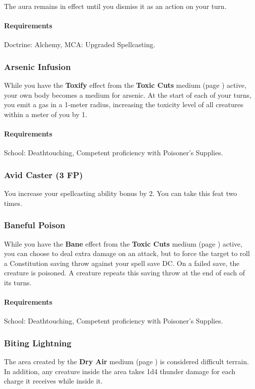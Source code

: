     The aura remains in effect until you dismiss it as an action on your turn.
    \paragraph{Requirements} Doctrine: Alchemy, MCA: Upgraded Spellcasting.
\subsubsection{Arsenic Infusion} \label{feat::arsenicinfusion}
    While you have the \textbf{Toxify} effect from the \textbf{Toxic Cuts} medium (page \pageref{medium::toxiccuts}) active, your own body becomes a medium for arsenic.
    At the start of each of your turns, you emit a gas in a 1-meter radius, increasing the toxicity level of all creatures within a meter of you by 1.
    \paragraph{Requirements} School: Deathtouching, Competent proficiency with Poisoner's Supplies.
\subsubsection{Avid Caster (3 FP)} \label{feat::avidcaster}
    You increase your spellcasting ability bonus by 2.
    You can take this feat two times.
\subsubsection{Baneful Poison} \label{feat::banefulpoison}
    While you have the \textbf{Bane} effect from the \textbf{Toxic Cuts} medium (page \pageref{medium::toxiccuts}) active, you can choose to deal extra damage on an attack, but to force the target to roll a Constitution saving throw against your spell save DC.
    On a failed save, the creature is poisoned.
    A creature repeats this saving throw at the end of each of its turns.
    \paragraph{Requirements} School: Deathtouching, Competent proficiency with Poisoner's Supplies.
\subsubsection{Biting Lightning} \label{feat::bitinglightning}
    The area created by the \textbf{Dry Air} medium (page \pageref{medium::dryair}) is considered difficult terrain.
    In addition, any creature inside the area takes 1d4 thunder damage for each charge it receives while inside it.
